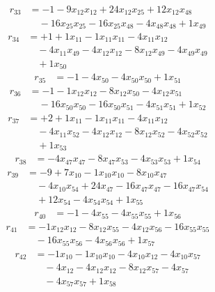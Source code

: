 \[\begin{aligned}
r_{33} &= - 1 - 9 x_{12} x_{12} + 24 x_{12} x_{25} + 12 x_{12} x_{48} \\
 &\quad - 16 x_{25} x_{25} - 16 x_{25} x_{48} - 4 x_{48} x_{48} + 1 x_{49}
\end{aligned}\]
\[\begin{aligned}
r_{34} &= + 1 + 1 x_{11} - 1 x_{11} x_{11} - 4 x_{11} x_{12} \\
 &\quad - 4 x_{11} x_{49} - 4 x_{12} x_{12} - 8 x_{12} x_{49} - 4 x_{49} x_{49} \\
 &\quad + 1 x_{50}
\end{aligned}\]
\[\begin{aligned}
r_{35} &= - 1 - 4 x_{50} - 4 x_{50} x_{50} + 1 x_{51}
\end{aligned}\]
\[\begin{aligned}
r_{36} &= - 1 - 1 x_{12} x_{12} - 8 x_{12} x_{50} - 4 x_{12} x_{51} \\
 &\quad - 16 x_{50} x_{50} - 16 x_{50} x_{51} - 4 x_{51} x_{51} + 1 x_{52}
\end{aligned}\]
\[\begin{aligned}
r_{37} &= + 2 + 1 x_{11} - 1 x_{11} x_{11} - 4 x_{11} x_{12} \\
 &\quad - 4 x_{11} x_{52} - 4 x_{12} x_{12} - 8 x_{12} x_{52} - 4 x_{52} x_{52} \\
 &\quad + 1 x_{53}
\end{aligned}\]
\[\begin{aligned}
r_{38} &= - 4 x_{47} x_{47} - 8 x_{47} x_{53} - 4 x_{53} x_{53} + 1 x_{54}
\end{aligned}\]
\[\begin{aligned}
r_{39} &= - 9 + 7 x_{10} - 1 x_{10} x_{10} - 8 x_{10} x_{47} \\
 &\quad - 4 x_{10} x_{54} + 24 x_{47} - 16 x_{47} x_{47} - 16 x_{47} x_{54} \\
 &\quad + 12 x_{54} - 4 x_{54} x_{54} + 1 x_{55}
\end{aligned}\]
\[\begin{aligned}
r_{40} &= - 1 - 4 x_{55} - 4 x_{55} x_{55} + 1 x_{56}
\end{aligned}\]
\[\begin{aligned}
r_{41} &= - 1 x_{12} x_{12} - 8 x_{12} x_{55} - 4 x_{12} x_{56} - 16 x_{55} x_{55} \\
 &\quad - 16 x_{55} x_{56} - 4 x_{56} x_{56} + 1 x_{57}
\end{aligned}\]
\[\begin{aligned}
r_{42} &= - 1 x_{10} - 1 x_{10} x_{10} - 4 x_{10} x_{12} - 4 x_{10} x_{57} \\
 &\quad - 4 x_{12} - 4 x_{12} x_{12} - 8 x_{12} x_{57} - 4 x_{57} \\
 &\quad - 4 x_{57} x_{57} + 1 x_{58}
\end{aligned}\]
